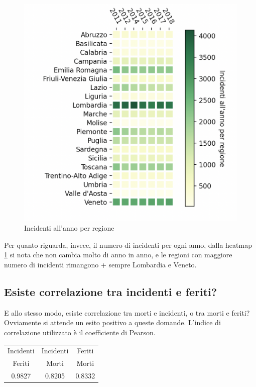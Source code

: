 \documentclass[a4paper]{report}
\begin{document}
\begin{figure}
    \includegraphics[width=\linewidth]{../src/incidenti/incidenti_aci/mappe_regioni/regioni_heatmap.png}
    \caption{Incidenti all'anno per regione}
    \label{fig:regione-heatmap}
\end{figure}

Per quanto riguarda, invece, il numero di incidenti per ogni anno, dalla heatmap \ref{fig:regione-heatmap} 
si nota che non cambia molto di anno in anno, e le regioni con maggiore numero di incidenti rimangono +
sempre Lombardia e Veneto.




\subsection{Esiste correlazione tra incidenti e feriti?}

E allo stesso modo, esiste correlazione tra morti e incidenti, o tra morti e feriti?\\
Ovviamente si attende un esito positivo a queste domande.
L'indice di correlazione utilizzato è il coefficiente di Pearson.
\begin{center}
    \begin{tabular}{ |c|c|c| } 
    \hline
    Incidenti & Incidenti & Feriti \\ 
    Feriti & Morti & Morti \\ 
    \hline
    \rowcolor{TableGray}
    0.9827 & 0.8205 & 0.8332 \\ 
    \hline
    \end{tabular}
\end{center}
\end{document}
